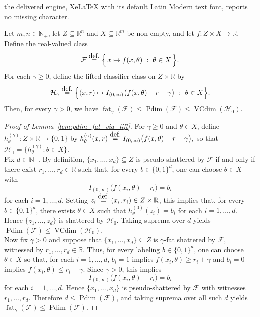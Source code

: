 \documentclass[10pt,a4paper]{amsart}
\newcommand{\eqdef}{\ensuremath{\stackrel{\mbox{\upshape\tiny def.}}{=}}}
\begin{document}
the delivered engine, XeLaTeX with its default Latin Modern text font, reports no missing character.
\begin{lemma}
\label{lem:pdim_fat_via_lift}
Let $m,n\in\mathbb{N}_+$, let $Z\subseteq \mathbb{R}^n$ and $X\subseteq \mathbb{R}^m$ be non-empty, and let
$f:Z\times X\to\mathbb{R}$.
Define the real-valued class
\[
\mathcal{F}\eqdef \Big\{\,x\mapsto f(x,\theta)\ :\ \theta\in X\,\Big\}.
\]
For each $\gamma\ge 0$, define the lifted classifier class on $Z\times\mathbb{R}$ by
\[
\mathcal{H}_\gamma
\eqdef
\Big\{
(x,r)\mapsto I_{(0,\infty)}\big(f(x,\theta)-r-\gamma\big)
\ :\ \theta\in X
\Big\}.
\]
Then, for every $\gamma>0$, we have
$
    \operatorname{fat}_\gamma(\mathcal{F})
    \le
    \operatorname{Pdim}(\mathcal{F})
    \le 
    \operatorname{VCdim}(\mathcal{H}_0)
$.
\end{lemma}

\begin{proof}[Proof of Lemma~\ref{lem:pdim_fat_via_lift}]
For $\gamma\ge 0$ and $\theta\in X$, define
$
h_{\theta}^{(\gamma)}:Z\times\mathbb{R}\to\{0,1\}
$
by
$
h_{\theta}^{(\gamma)}(x,r)\eqdef I_{(0,\infty)}\big(f(x,\theta)-r-\gamma\big),
$
so that $\mathcal{H}_\gamma=\{h_{\theta}^{(\gamma)}:\theta\in X\}$.
\hfill\\
\noindent
Fix $d\in\mathbb{N}_+$.  By definition, $\{x_1,\dots,x_d\}\subseteq Z$ is pseudo-shattered by $\mathcal{F}$ if and only if there exist
$r_1,\dots,r_d\in\mathbb{R}$ such that, for every $b\in\{0,1\}^d$, one can choose $\theta\in X$ with
\[
    I_{(0,\infty)}\big(f(x_i,\theta)-r_i\big)=b_i
\]
for each $i=1,\dots,d$.
Setting $z_i\eqdef (x_i,r_i)\in Z\times\mathbb{R}$, this implies that, for every $b\in\{0,1\}^d$, there exists $\theta\in X$ such that
$
    h_{\theta}^{(0)}(z_i)=b_i
$
for each $i=1,\dots,d$.  Hence $\{z_1,\dots,z_d\}$ is shattered by $\mathcal{H}_0$.  Taking suprema over $d$ yields
$
    \operatorname{Pdim}(\mathcal{F})\le \operatorname{VCdim}(\mathcal{H}_0)
$.
\hfill\\
\noindent
Now fix $\gamma>0$ and suppose that $\{x_1,\dots,x_d\}\subseteq Z$ is $\gamma$-fat shattered by $\mathcal{F}$, witnessed by
$r_1,\dots,r_d\in\mathbb{R}$.  Thus, for every labeling $b\in\{0,1\}^d$, one can choose $\theta\in X$ so that, for each
$i=1,\dots,d$,
$
b_i=1
$
implies
$
f(x_i,\theta)\ge r_i+\gamma
$
and
$
b_i=0
$
implies
$
f(x_i,\theta)\le r_i-\gamma.
$
Since $\gamma>0$, this implies
\[
    I_{(0,\infty)}\big(f(x_i,\theta)-r_i\big)=b_i
\]
for each $i=1,\dots,d$.  Hence $\{x_1,\dots,x_d\}$ is pseudo-shattered by $\mathcal{F}$ with witnesses
$r_1,\dots,r_d$.  Therefore $d\le \operatorname{Pdim}(\mathcal{F})$, and taking suprema over all such $d$ yields
$
    \operatorname{fat}_\gamma(\mathcal{F})\le \operatorname{Pdim}(\mathcal{F})
$.
\end{proof}
\end{document}
